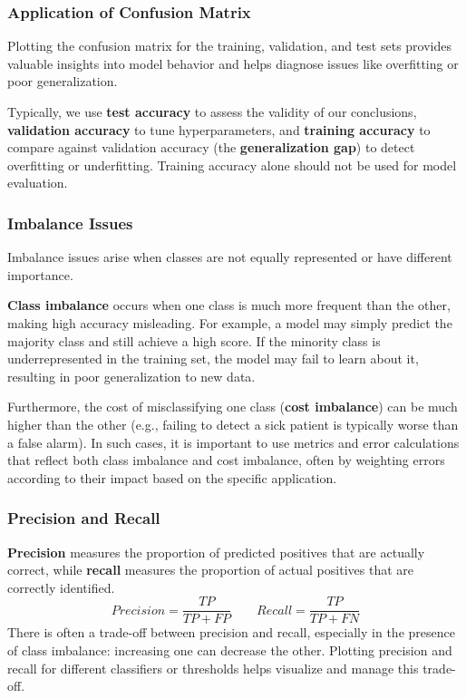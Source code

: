 \subsubsection*{Application of Confusion Matrix}
Plotting the confusion matrix for the training, validation, and test sets provides valuable insights into model behavior and helps diagnose issues like overfitting or poor generalization.

Typically, we use \textbf{test accuracy} to assess the validity of our conclusions, \textbf{validation accuracy} to tune hyperparameters, and \textbf{training accuracy} to compare against validation accuracy (the \textbf{generalization gap}) to detect overfitting or underfitting.
Training accuracy alone should not be used for model evaluation.

\subsubsection{Imbalance Issues}
Imbalance issues arise when classes are not equally represented or have different importance.

\textbf{Class imbalance} occurs when one class is much more frequent than the other, making high accuracy misleading.
For example, a model may simply predict the majority class and still achieve a high score.
If the minority class is underrepresented in the training set, the model may fail to learn about it, resulting in poor generalization to new data.

Furthermore, the cost of misclassifying one class (\textbf{cost imbalance}) can be much higher than the other (e.g., failing to detect a sick patient is typically worse than a false alarm).
In such cases, it is important to use metrics and error calculations that reflect both class imbalance and cost imbalance, often by weighting errors according to their impact based on the specific application.

\subsubsection{Precision and Recall}
\textbf{Precision} measures the proportion of predicted positives that are actually correct, while \textbf{recall} measures the proportion of actual positives that are correctly identified.
\[
    Precision = \frac{TP}{TP + FP} \quad\quad Recall = \frac{TP}{TP + FN}
\]
There is often a trade-off between precision and recall, especially in the presence of class imbalance: increasing one can decrease the other. 
Plotting precision and recall for different classifiers or thresholds helps visualize and manage this trade-off.

